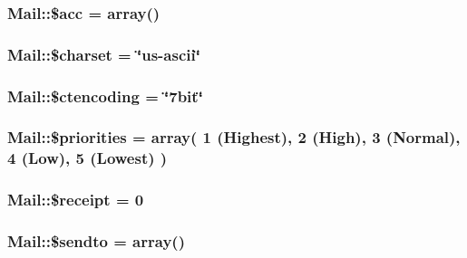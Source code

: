 \hypertarget{classMail_o1}{
\subsubsection[\$acc]{\setlength{\rightskip}{0pt plus 5cm}Mail::\$acc = array()}}
\label{classMail_o1}


\hypertarget{classMail_o6}{
\subsubsection[\$charset]{\setlength{\rightskip}{0pt plus 5cm}Mail::\$charset = \char`\"{}us-ascii\char`\"{}}}
\label{classMail_o6}


\hypertarget{classMail_o7}{
\subsubsection[\$ctencoding]{\setlength{\rightskip}{0pt plus 5cm}Mail::\$ctencoding = \char`\"{}7bit\char`\"{}}}
\label{classMail_o7}


\hypertarget{classMail_o5}{
\subsubsection[\$priorities]{\setlength{\rightskip}{0pt plus 5cm}Mail::\$priorities = array( 1 (Highest), 2 (High), 3 (Normal), 4 (Low), 5 (Lowest) )}}
\label{classMail_o5}


\hypertarget{classMail_o8}{
\subsubsection[\$receipt]{\setlength{\rightskip}{0pt plus 5cm}Mail::\$receipt = 0}}
\label{classMail_o8}


\hypertarget{classMail_o0}{
\subsubsection[\$sendto]{\setlength{\rightskip}{0pt plus 5cm}Mail::\$sendto = array()}}
\label{classMail_o0}


